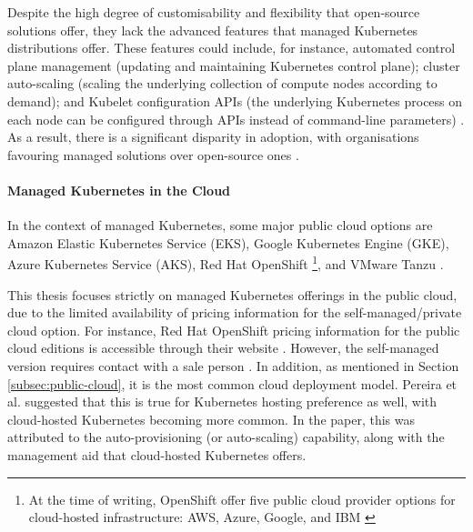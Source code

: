 Despite the high degree of customisability and flexibility that open-source solutions offer, they lack the advanced features that managed Kubernetes distributions offer. These features could include, for instance, automated control plane management (updating and maintaining Kubernetes control plane); cluster auto-scaling (scaling the underlying collection of compute nodes according to demand); and Kubelet configuration APIs (the underlying Kubernetes process on each node can be configured through APIs instead of command-line parameters) \cite{truyenManagingFeatureCompatibility2020, KubeletConfigMachineconfigurationopenshiftioV1, AmazonEKSCustomers, RedHatOpenShiftb}. As a result, there is a significant disparity in adoption, with organisations favouring managed solutions over open-source ones \cite{redhatinc.StateKubernetesSecurity2024}.

\paragraph{Managed Kubernetes in the Cloud}\label{par:managed-kubernetes}\mbox{}

In the context of managed Kubernetes, some major public cloud options are Amazon Elastic Kubernetes Service (EKS), Google Kubernetes Engine (GKE), Azure Kubernetes Service (AKS), Red Hat OpenShift \footnote{At the time of writing, OpenShift offer five public cloud provider options for cloud-hosted infrastructure: AWS, Azure, Google, and IBM \cite{OpenShiftContainerPlatform}}, and VMware Tanzu \cite{AmazonEKSCustomers, nickomangAzureKubernetesService, GKEOverviewGoogle, redhatinc.RedHatOpenShift, VMwareTanzuPlatform}.

This thesis focuses strictly on managed Kubernetes offerings in the public cloud, due to the limited availability of pricing information for the self-managed/private cloud option. For instance, Red Hat OpenShift pricing information for the public cloud editions is accessible through their website \cite{redhatinc.RedHatOpenShift}. However, the self-managed version requires contact with a sale person \cite{RedHatOpenShifte}. In addition, as mentioned in Section \ref{subsec:public-cloud}, it is the most common cloud deployment model. Pereira et al. \cite{pereiraferreiraPerformanceEvaluationContainers2019} suggested that this is true for Kubernetes hosting preference as well, with cloud-hosted Kubernetes becoming more common. In the paper, this was attributed to the auto-provisioning (or auto-scaling) capability, along with the management aid that cloud-hosted Kubernetes offers.

